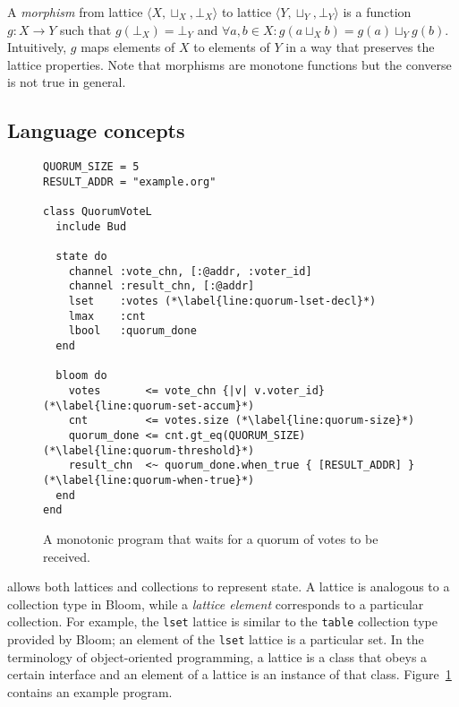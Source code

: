 A \emph{morphism} from lattice $\langle X, \sqcup_X, \bot_X\rangle$ to lattice
$\langle Y, \sqcup_Y, \bot_Y\rangle$ is a function $g: X \to Y$ such that
$g(\bot_X) = \bot_Y$ and $\forall a,b \in X: g(a \sqcup_X b) = g(a) \sqcup_Y
g(b)$. Intuitively, $g$ maps elements of $X$ to elements of $Y$ in a way that
preserves the lattice properties.  Note that morphisms are monotone functions
but the converse is not true in general.

\subsection{Language concepts}
\begin{figure}[t]
\begin{scriptsize}
\begin{lstlisting}
QUORUM_SIZE = 5
RESULT_ADDR = "example.org"

class QuorumVoteL
  include Bud

  state do
    channel :vote_chn, [:@addr, :voter_id]
    channel :result_chn, [:@addr]
    lset    :votes (*\label{line:quorum-lset-decl}*)
    lmax    :cnt
    lbool   :quorum_done
  end

  bloom do
    votes       <= vote_chn {|v| v.voter_id} (*\label{line:quorum-set-accum}*)
    cnt         <= votes.size (*\label{line:quorum-size}*)
    quorum_done <= cnt.gt_eq(QUORUM_SIZE) (*\label{line:quorum-threshold}*)
    result_chn  <~ quorum_done.when_true { [RESULT_ADDR] } (*\label{line:quorum-when-true}*)
  end
end
\end{lstlisting}
\end{scriptsize}
\caption{A monotonic \lang program that waits for a quorum of votes to be received.}
\label{fig:lattice-quorum}
\end{figure}

\lang allows both lattices and collections to represent state. A lattice is
analogous to a collection type in Bloom, while a \emph{lattice element}
corresponds to a particular collection. For example, the \texttt{lset} lattice
is similar to the \texttt{table} collection type provided by Bloom; an element
of the \texttt{lset} lattice is a particular set. In the terminology of
object-oriented programming, a lattice is a class that obeys a certain interface
and an element of a lattice is an instance of that
class. Figure~\ref{fig:lattice-quorum} contains an example \lang program.

